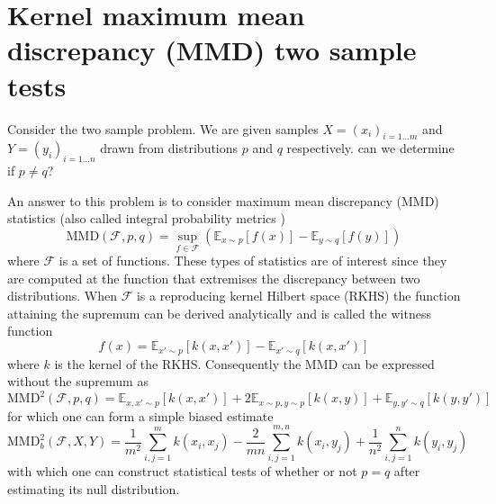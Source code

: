 \documentclass{article} %
\begin{document}
\section{Kernel maximum mean discrepancy (MMD) two sample tests}

Consider the two sample problem. We are given samples $X = (x_i)_{i=1\ldots m}$ and $Y = (y_i)_{i=1\ldots n}$ drawn \iid from distributions $p$ and $q$ respectively. can we determine if $p \neq q$?

An answer to this problem is to consider maximum mean discrepancy (MMD) \citep{Gretton2008-ik} statistics (also called integral probability metrics \citep{Muller1997-vs})
\begin{equation}
\textrm{MMD}(\mathcal{F},p,q) = \sup_{f \in \mathcal{F}}(\mathbb{E}_{x\sim p}[f(x)] - \mathbb{E}_{y\sim q}[f(y)])
\end{equation}
where $\mathcal{F}$ is a set of functions.
These types of statistics are of interest since they are computed at the function that extremises the discrepancy between two distributions.
When $\mathcal{F}$ is a reproducing kernel Hilbert space (RKHS) the function attaining the supremum can be derived analytically and is called the witness function
\begin{equation}
f(x) = \mathbb{E}_{x'\sim p}[k(x,x')] - \mathbb{E}_{x'\sim q}[k(x,x')]
\end{equation}
where $k$ is the kernel of the RKHS.
Consequently the MMD can be expressed without the supremum as
\begin{equation}
  \textrm{MMD}^2(\mathcal{F},p,q) = \mathbb{E}_{x,x'\sim p}[k(x,x')] + 2\mathbb{E}_{x\sim p,y\sim p}[k(x,y)] + \mathbb{E}_{y,y'\sim q}[k(y,y')]
\end{equation}
for which one can form a simple biased estimate
\begin{equation}
  \textrm{MMD}_b^2(\mathcal{F},X,Y) = \frac{1}{m^2}\sum_{i,j=1}^{m}k(x_i,x_j) - \frac{2}{mn}\sum_{i,j=1}^{m,n}k(x_i,y_j) + \frac{1}{n^2}\sum_{i,j=1}^{n}k(y_i,y_j)
\label{eq:MMD_b}
\end{equation}
with which one can construct statistical tests of whether or not ${p=q}$ after estimating its null distribution.
\end{document}
